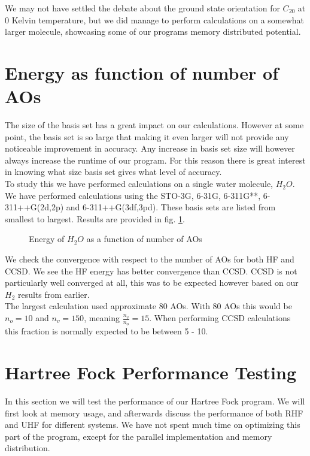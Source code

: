 \documentclass[a4paper,norsk,11pt,twoside]{report}
\begin{document}
We may not have settled the debate about the ground state orientation for $C_{20}$ at 0 Kelvin temperature, but we did manage to perform calculations on a somewhat larger molecule, showcasing some of our programs memory distributed potential. 

\section{Energy as function of number of AOs}
The size of the basis set has a great impact on our calculations. However at some point, the basis set is so large that making it even larger will not provide any noticeable improvement in accuracy. Any increase in basis set size will however always increase the runtime of our program. For this reason there is great interest in knowing what size basis set gives what level of accuracy. \\

To study this we have performed calculations on a single water molecule, $H_2O$. We have performed calculations using the STO-3G, 6-31G, 6-311G**, 6-311++G(2d,2p) and 6-311++G(3df,3pd). These basis sets are listed from smallest to largest. Results are provided in fig. \ref{fig:convplot}. \\

\begin{figure}[h!]
\begin{center}
\caption{Energy of $H_2O$ as a function of number of AOs}
\label{fig:convplot}
\end{center}
\end{figure} 

We check the convergence with respect to the number of AOs for both HF and CCSD. We see the HF energy has better convergence than CCSD. CCSD is not particularly well converged at all, this was to be expected however based on our $H_2$ results from earlier. \\

The largest calculation used approximate 80 AOs. With 80 AOs this would be $n_o = 10$ and $n_v = 150$, meaning $\frac{n_v}{n_o} = 15$. When performing CCSD calculations this fraction is normally expected to be between 5 - 10.

\section{Hartree Fock Performance Testing}
In this section we will test the performance of our Hartree Fock program. We will first look at memory usage, and afterwards discuss the performance of both RHF and UHF for different systems. We have not spent much time on optimizing this part of the program, except for the parallel implementation and memory distribution. \\
\end{document}
